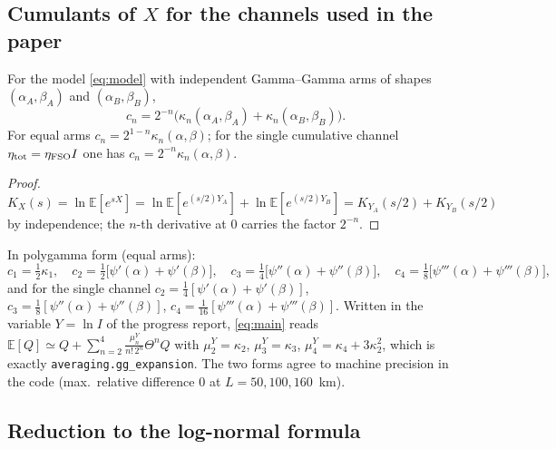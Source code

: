 \subsection{Cumulants of $X$ for the channels used in the paper}
\label{sec:cumX}

\begin{proposition}\label{prop:cX}
For the model \eqref{eq:model} with independent Gamma--Gamma arms of shapes $(\alpha_A,\beta_A)$ and $(\alpha_B,\beta_B)$,
\begin{equation}
  c_n=2^{-n}\big(\kappa_n(\alpha_A,\beta_A)+\kappa_n(\alpha_B,\beta_B)\big).
\end{equation}
For equal arms $c_n=2^{1-n}\kappa_n(\alpha,\beta)$; for the single cumulative channel $\eta_{\rm tot}=\eta_{\rm FSO}I$ one has $c_n=2^{-n}\kappa_n(\alpha,\beta)$.
\end{proposition}
\begin{proof}
$K_X(s)=\ln\mathbb E[e^{sX}]=\ln\mathbb E[e^{(s/2)Y_A}]+\ln\mathbb E[e^{(s/2)Y_B}]=K_{Y_A}(s/2)+K_{Y_B}(s/2)$ by independence; the $n$-th derivative at $0$ carries the factor $2^{-n}$.
\end{proof}
In polygamma form (equal arms):
\begin{equation}
  c_1=\tfrac12\kappa_1,\quad c_2=\tfrac12\big[\psi'(\alpha)+\psi'(\beta)\big],\quad
  c_3=\tfrac14\big[\psi''(\alpha)+\psi''(\beta)\big],\quad
  c_4=\tfrac18\big[\psi'''(\alpha)+\psi'''(\beta)\big],
\end{equation}
and for the single channel $c_2=\tfrac14[\psi'(\alpha)+\psi'(\beta)]$, $c_3=\tfrac18[\psi''(\alpha)+\psi''(\beta)]$, $c_4=\tfrac1{16}[\psi'''(\alpha)+\psi'''(\beta)]$. Written in the variable $Y=\ln I$ of the progress report, \eqref{eq:main} reads $\mathbb E[Q]\simeq Q+\sum_{n=2}^{4}\frac{\mu^Y_n}{n!\,2^{n}}\Theta^nQ$ with $\mu^Y_2=\kappa_2$, $\mu^Y_3=\kappa_3$, $\mu^Y_4=\kappa_4+3\kappa_2^2$, which is exactly \texttt{averaging.gg\_expansion}. The two forms agree to machine precision in the code (max.\ relative difference $0$ at $L=50,100,160$~km).

\subsection{Reduction to the log-normal formula}

